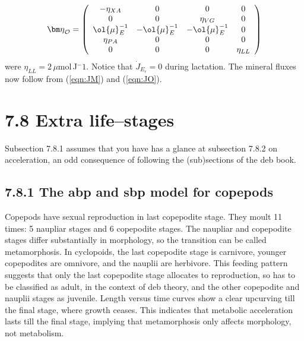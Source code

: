 \[
   {\bm  \eta}_{\cal O} =  \left( \begin{array}{ccccc}
      -\eta_{XA}      & 0                 & 0                 & 0\\ 
      0               & 0                 & \eta_{VG}         & 0\\ 
      \ol{\mu}_E^{-1} & - \ol{\mu}_E^{-1} & - \ol{\mu}_E^{-1} & 0\\ 
      \eta_{PA}       & 0                 & 0                 & 0\\
      0               & 0                 & 0                 & \eta_{LL}
    \end{array} \right)  
\]
were $\eta_{LL} = 2\,\mu$mol\,J${^-1}$.
Notice that $\dot{J}_{E_r} = 0$ during lactation.
The mineral fluxes now follow from (\ref{eqn:JM}) and (\ref{eqn:JO}).

\section*{7.8 Extra life--stages}
{}
\label{sec_c:life_stage}

Subsection 7.8.1 assumes that you have has a glance at subsection 7.8.2 on acceleration, an odd consequence of following the (sub)sections of the {\sc deb} book.

\subsection*{7.8.1 The abp and sbp model for copepods}
{}
\label{ssec_c:Copepods}

Copepods have sexual reproduction in last copepodite stage.  
They moult 11 times: 5 naupliar stages and 6 copepodite stages.
The naupliar and copepodite stages differ substantially in morphology, so the transition can be called metamorphosis.
In cyclopoids, the last copepodite stage is carnivore, younger copepodites are omnivore, and the nauplii are herbivore.
This feeding pattern suggests that only the last copepodite stage allocates to reproduction, so has to be classified as adult, in the context of {\sc deb} theory, and the other copepodite and nauplii stages as juvenile.
Length versus time curves show a clear upcurving till the final stage, where growth ceases.
This indicates that metabolic acceleration lasts till the final stage, implying that metamorphosis only affects morphology, not metabolism.

